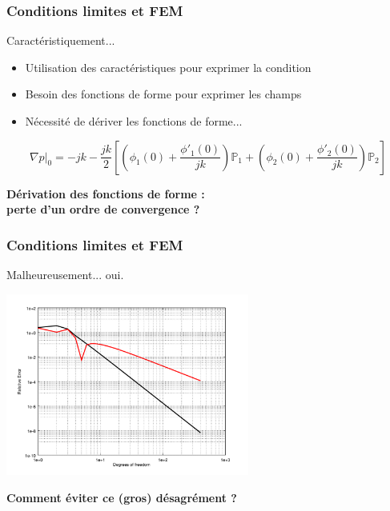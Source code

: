 \documentclass[10pt, compress]{beamer}
\newcommand\GP{\mathbb{P}}
\begin{document}
\begin{frame}
	\frametitle{Conditions limites et FEM}

	\begin{block}{Caractéristiquement...}
		\begin{itemize}
			\item Utilisation des caractéristiques pour exprimer la condition
			\item Besoin des fonctions de forme pour exprimer les champs
			\item Nécessité de dériver les fonctions de forme...
		\end{itemize}

		\pause

		\begin{equation*}
			\nabla p\bigg|_0 = - jk -\frac{jk}{2}\left[\left(\phi_1(0) + \frac{\phi'_1(0)}{jk}\right)\GP_1 + \left(\phi_2(0) + \frac{\phi'_2(0)}{jk}\right)\GP_2 \right]
		\end{equation*}
	\end{block}

	\begin{center}
		\alert{\textbf{Dérivation des fonctions de forme : \\perte d'un ordre de convergence ?}}
	\end{center}
\end{frame}

\begin{frame}
	\frametitle{Conditions limites et FEM}
	\begin{block}{Malheureusement... oui.}
		\begin{center}
		\includegraphics[width=0.6\textwidth]{../report/part3/figs/convergence.png}
		\end{center}
	\end{block}

	\pause

	\begin{center}
		\alert{\textbf{
		Comment éviter ce (gros) désagrément ?
		}}
	\end{center}
\end{frame}
\end{document}
